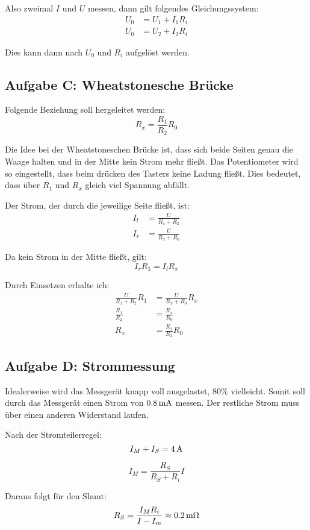 \documentclass[11pt,german]{article}
\begin{document}
Also zweimal $I$ und $U$ messen, dann gilt folgendes Gleichungssystem:
\begin{align*}
	U_0 &= U_1 + I_1 R_i \\
	U_0 &= U_2 + I_2 R_i
\end{align*}

Dies kann dann nach $U_0$ und $R_i$ aufgelöst werden.

\subsection{Aufgabe C: Wheatstonesche Brücke}

Folgende Beziehung soll hergeleitet werden:
\[ R_x = \frac{R_1}{R_2} R_0 \]

Die Idee bei der Wheatstoneschen Brücke ist, dass sich beide Seiten
genau die Waage halten und in der Mitte kein Strom mehr fließt. Das
Potentiometer wird so eingestellt, dass beim drücken des Tasters keine
Ladung fließt. Dies bedeutet, dass über $R_1$ und $R_x$ gleich viel
Spannung abfällt.

Der Strom, der durch die jeweilige Seite fließt, ist:
\begin{align*}
	I_l &= \frac U{R_1 + R_2} \\
	I_r &= \frac U{R_x + R_0}
\end{align*}

Da kein Strom in der Mitte fließt, gilt:
\[ I_r R_1 = I_l R_x \]

Durch Einsetzen erhalte ich:
\begin{align*}
	\frac U{R_1 + R_2} R_1 &= \frac U{R_x + R_0} R_x \\
	\frac {R_1}{R_2}  &= \frac {R_x}{R_0} \\
	R_x &= \frac {R_1}{R_2} R_0
\end{align*}

\subsection{Aufgabe D: Strommessung}

Idealerweise wird das Messgerät knapp voll ausgelastet, 80\% vielleicht.  Somit
soll durch das Messgerät einen Strom von $\unit[0.8]{mA}$ messen. Der restliche
Strom muss über einen anderen Widerstand laufen.

Nach der Stromteilerregel:
\[ I_M + I_S = \unit[4]A \]

\[ I_M = \frac{R_S}{R_S + R_i} I \]

Daraus folgt für den Shunt:
\[ R_S = \frac{I_M R_i}{I - I_m} \approx \unit[0.2]{m\Omega} \]
\end{document}
